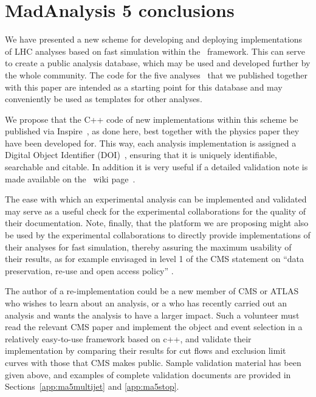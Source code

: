 
\section{MadAnalysis 5 conclusions}\label{sec:conclusions}


We have presented a new scheme for developing and deploying implementations of LHC analyses 
based on fast simulation within the \ma\ framework. This can serve to create a public analysis database,  
which may be used and developed further by the whole community.  
The code for the five analyses~\cite{MA5-CMS-SUS-13-011,MA5-CMS-SUS-13-012,MA5-CMS-SUS-13-016,MA5-ATLAS-SUSY-2013-05,MA5-ATLAS-SUSY-2013-11} 
that we published together with this paper are intended as a starting point 
for this database and may conveniently be used as templates for other analyses.  

We propose that the C++ code of new implementations within this scheme be published 
via {\sc Inspire}~\cite{inspire}, as done here,  
best together with the physics paper they have been developed for. 
This way, each analysis implementation is assigned a 
Digital Object Identifier (DOI)~\cite{doi}, ensuring that it is uniquely identifiable, searchable and citable. 
In addition it is very useful if a detailed validation note is made available on the  \ma\ wiki page~\cite{ma5wiki}. 

The ease with which an experimental analysis can be implemented and validated may serve as a useful check for the experimental collaborations for the quality of their documentation. Note, finally, that the platform we are pro\-posing might also be used by the experimental collaborations to directly provide implementations of their analyses for fast simulation, thereby assuring the maximum usability of their results, as for example envisaged in level 1 of the CMS statement on ``data preservation, re-use and open access policy'' \cite{CMS:DataPolicy}. 

The author of a re-implementation could be a new member of CMS or ATLAS who wishes to learn about an analysis, or a who has recently carried out an analysis and wants the analysis to have a larger impact. Such a volunteer must read the relevant CMS paper and implement the object and event selection in a relatively easy-to-use framework based on c++, and validate their implementation by comparing their results for cut flows and exclusion limit curves with those that CMS makes public. Sample validation material has been given above, and examples of complete validation documents are provided in Sections~\ref{app:ma5multijet} and \ref{app:ma5stop}.

